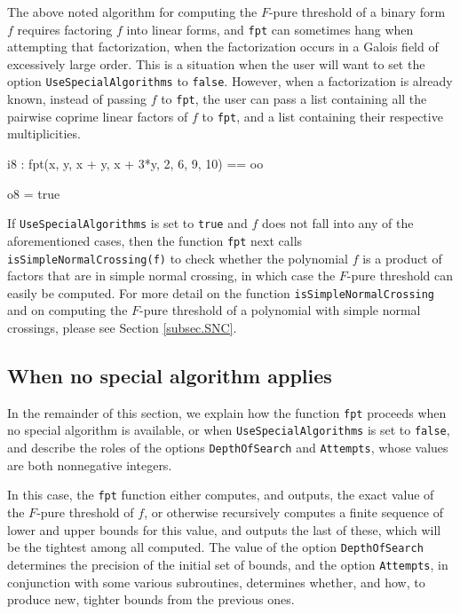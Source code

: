 \documentclass{amsart}
\begin{document}
The above noted algorithm for computing the $F$-pure threshold of a binary form $f$ requires factoring $f$ into linear forms, and \texttt{fpt} can sometimes hang when attempting that factorization, when the factorization occurs in a Galois field of excessively large order.
This is a situation when the user will want to set the option \texttt{UseSpecialAlgorithms} to \texttt{false}.
However, when a factorization is already known, instead of passing $f$ to \texttt{fpt}, the user can pass a list containing all the pairwise coprime linear factors of $f$ to \texttt{fpt}, and a list containing their respective multiplicities.


\bigskip
{\small
{}
\begin{MyVerbatim}
i8 : fpt({x, y, x + y, x + 3*y}, {2, 6, 9, 10}) == oo

o8 = true
\end{MyVerbatim}
}
\bigskip

If \texttt{UseSpecialAlgorithms} is set to \texttt{true} and $f$ does not fall into any of the aforementioned cases, then the function \texttt{fpt} next calls \texttt{isSimpleNormalCrossing(f)} to check whether the polynomial $f$ is a product of factors that are in simple normal crossing, in which case the $F$-pure threshold can easily be computed.
For more detail on the function \texttt{isSimpleNormalCrossing} and on computing the $F$-pure threshold of a polynomial with simple normal crossings, please see Section \ref{subsec.SNC}.

\subsection{When no special algorithm applies}

In the remainder of this section, we explain how the function  \texttt{fpt} proceeds when no special algorithm is available, or when \texttt{UseSpecialAlgorithms} is set to \texttt{false}, and describe the roles of the options \texttt{DepthOfSearch} and \texttt{Attempts}, whose values are both nonnegative integers.

In this case, the \texttt{fpt} function either computes, and outputs, the exact value of the $F$-pure threshold of $f$, or otherwise recursively computes a finite sequence of lower and upper bounds for this value, and outputs the last of these, which will be the tightest among all computed.  The value of the option \texttt{DepthOfSearch} determines the precision of the initial set of bounds, and the option \texttt{Attempts}, in conjunction with some various subroutines, determines whether, and how, to produce new, tighter bounds from the previous ones.
\end{document}
